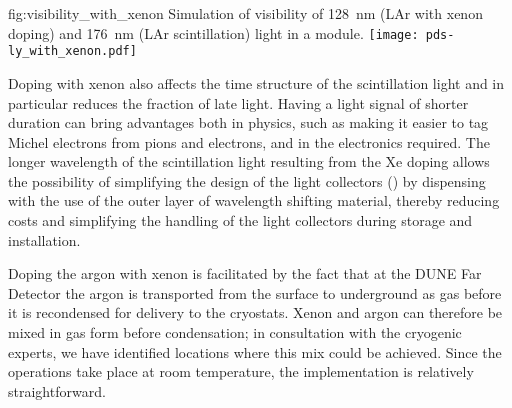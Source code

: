 \begin{dunefigure}
{fig:visibility_with_xenon}
{Simulation of visibility of \SI{128}{nm} (LAr with xenon doping) and \SI{176}{nm} (LAr scintillation) light in a  module.}
\texttt{[image: pds-ly\_with\_xenon.pdf]}
\end{dunefigure}

Doping with xenon also affects the time structure of the scintillation light and in particular reduces the fraction of late light.  Having a light signal of shorter duration can bring advantages both in physics, such as making it easier to tag Michel electrons from pions and electrons, and in the electronics required. The longer wavelength of the scintillation light resulting from the Xe doping allows the possibility of simplifying the design of the  light collectors () by dispensing with the use of the outer layer of wavelength shifting material, thereby reducing costs and simplifying the handling of the light collectors during storage and installation. 


Doping the argon with xenon is facilitated by the fact that at the DUNE Far Detector the argon is transported from the surface to underground as gas before it is recondensed for delivery to the cryostats. Xenon and argon can therefore be mixed in gas form before condensation;  in consultation with the cryogenic experts, we have identified locations where this mix could be achieved. Since the operations take place at room temperature, the implementation is relatively straightforward.


